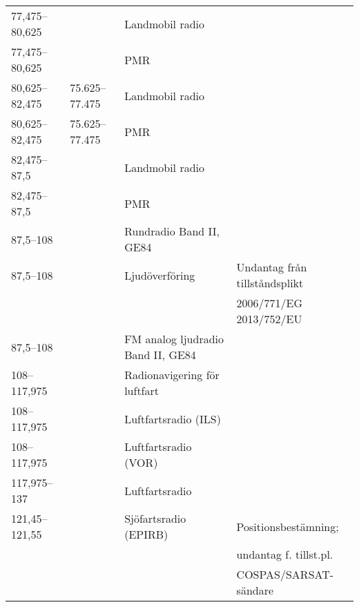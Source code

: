 \begin{landscape}
\begin{longtable}{llll}
	77,475--80,625                         &                    & Landmobil radio                       &  \\
	77,475--80,625                         &                    & PMR                                   &  \\
	80,625--82,475                         & 75.625--77.475     & Landmobil radio                       &  \\
	80,625--82,475                         & 75.625--77.475     & PMR                                   &  \\
	82,475--87,5                           &                    & Landmobil radio                       &  \\
	82,475--87,5                           &                    & PMR                                   &  \\
	87,5--108                              &                    & Rundradio	Band II, GE84               &  \\
	87,5--108                              &                    & Ljudöverföring                        & Undantag från tillståndsplikt  \\
	                                       &                    &                                       & 2006/771/EG 2013/752/EU        \\
	87,5--108                              &                    & FM analog ljudradio	Band II, GE84     &  \\
	108--117,975                           &                    & Radionavigering för luftfart          &  \\
	108--117,975                           &                    & Luftfartsradio (ILS)                  &  \\
	108--117,975                           &                    & Luftfartsradio (VOR)                  &  \\
	117,975--137                           &                    & Luftfartsradio                        &  \\
	121,45--121,55                         &                    & Sjöfartsradio (EPIRB)                 & Positionsbestämning;           \\
	                                       &                    &                                       & undantag f. tillst.pl.         \\
	                                       &                    &                                       & COSPAS/SARSAT-sändare          \\

\end{longtable}
\end{landscape}
